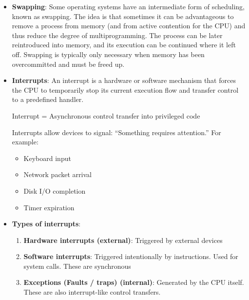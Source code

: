 \documentclass{report}
\begin{document}
\begin{itemize}
            \bigbreak \noindent 
            Although a CPU-bound process will require a CPU core for longer durations, the scheduler is unlikely to grant the core to a process for an extended period. Instead, it is likely designed to forcibly remove the CPU from a process and schedule another process to run.
            \bigbreak \noindent 
            Therefore, the CPU scheduler executes at least once every 100ms.
        \item \textbf{Swapping}: Some operating systems have an intermediate form of scheduling, known as swapping. The idea is that sometimes it can be advantageous to remove a process from memory (and from active contention for the CPU) and thus reduce the degree of multiprogramming. The process can be later reintroduced into memory, and its execution can be continued where it left off.
            \bigbreak \noindent 
            Swapping is typically only necessary when memory has been overcommitted and must be freed up.
        \item \textbf{Interrupts}: An interrupt is a hardware or software mechanism that forces the CPU to temporarily stop its current execution flow and transfer control to a predefined handler.
            \begin{center}
                Interrupt = Asynchronous control transfer into privileged code
            \end{center}
            Interrupts allow devices to signal: “Something requires attention.” For example:
            \begin{itemize}
                \item Keyboard input
                \item Network packet arrival
                \item Disk I/O completion
                \item Timer expiration
            \end{itemize}
        \item \textbf{Types of interrupts}: 
            \begin{enumerate}
                \item \textbf{Hardware interrupts (external)}: Triggered by external devices
                \item \textbf{Software interrupts}: Triggered intentionally by instructions. Used for system calls.
                    \bigbreak \noindent 
                    These are synchronous
                \item \textbf{Exceptions (Faults / traps) (internal)}: Generated by the CPU itself. These are also interrupt-like control transfers.

\end{enumerate}
\end{itemize}
\end{document}
